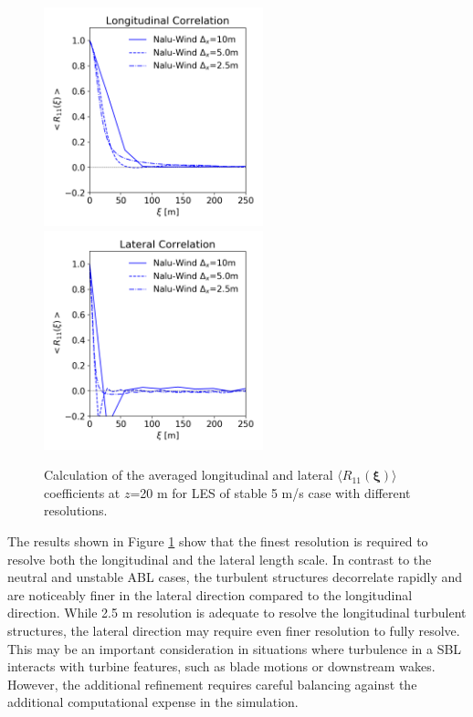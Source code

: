 \begin{figure}%
  \centering
  \includegraphics[width=2.5in]{figures/GridStudy_Rij_Longitudinal.png}
  \includegraphics[width=2.5in]{figures/GridStudy_Rij_Lateral.png}
  \caption{\label{fig:GridStudyRij} Calculation of the averaged
    longitudinal and lateral $\langle R_{11}(\boldsymbol{\xi})
    \rangle$ coefficients at $z$=20 m for LES of stable 5 m/s case with
    different resolutions.}
\end{figure}

The results shown in Figure  \ref{fig:GridStudyRij} show that the
finest resolution is required to resolve both the longitudinal and the
lateral length scale.  In contrast to the neutral and unstable ABL
cases, the turbulent structures decorrelate rapidly and are noticeably
finer in the lateral direction compared to the longitudinal direction.
While 2.5 m resolution is adequate to resolve the longitudinal
turbulent structures, the lateral direction may require even finer
resolution to fully resolve.  This may be an important consideration
in situations where turbulence in a SBL interacts
with turbine features, such as blade motions or downstream wakes.
However, the additional refinement requires careful balancing against
the additional computational expense in the simulation.

